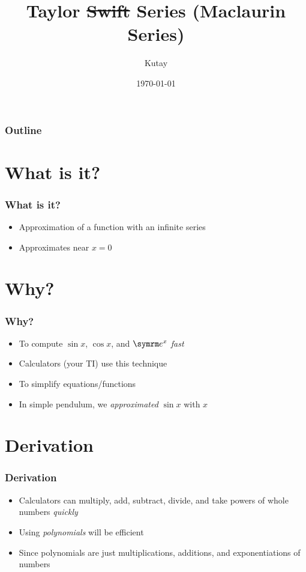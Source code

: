 \documentclass{beamer}
\title{Taylor \sout{Swift} Series (Maclaurin Series)}
\author{Kutay}
\institute{Made with LaTeX}
\date{\today}
\begin{document}
\begin{frame}
  \titlepage
\end{frame}

\begin{frame}
  \frametitle{Outline}
  \tableofcontents
\end{frame}

\section{What is it?}

\begin{frame}
  \frametitle{What is it?}
  \begin{itemize}
    \item Approximation of a function with an infinite series
    \item Approximates near \( x = 0 \)
  \end{itemize}
\end{frame}

\section{Why?}

\begin{frame}
  \frametitle{Why?}
  \begin{itemize}
    \item To compute \( \sin x \), \( \cos x \), and \( \e^x \) \textit{fast}
    \item Calculators (your TI) use this technique
    \item To simplify equations/functions
    \item In simple pendulum, we \textit{approximated} \( \sin x \) with \( x \)
  \end{itemize}
\end{frame}

\section{Derivation}

\begin{frame}
  \frametitle{Derivation}
  \begin{itemize}
    \item Calculators can multiply, add, subtract, divide, and take powers of whole numbers \textit{quickly}
    \item Using \textit{polynomials} will be efficient
    \item Since polynomials are just multiplications, additions, and exponentiations of numbers
  \end{itemize}
\end{frame}
\end{document}
